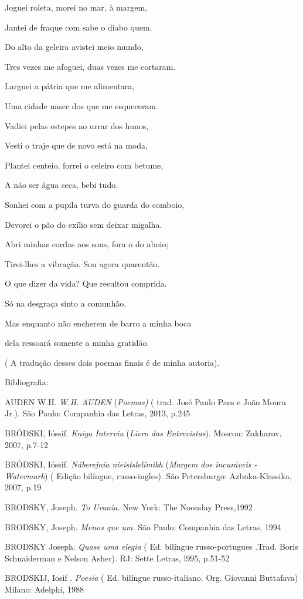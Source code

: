 Joguei roleta, morei no mar, à margem,

Jantei de fraque com sabe o diabo quem.

Do alto da geleira avistei meio mundo,

Tres vezes me afoguei, duas vezes me cortaram.

Larguei a pátria que me alimentara,

Uma cidade nasce dos que me esqueceram.

Vadiei pelas estepes ao urrar dos hunos,

Vesti o traje que de novo está na moda,

Plantei centeio, forrei o celeiro com betume,

A não ser água seca, bebi tudo.

Sonhei com a pupila turva do guarda do comboio,

Devorei o pão do exílio sem deixar migalha.

Abri minhas cordas aos sons, fora o do aboio;

Tirei-lhes a vibração. Sou agora quarentão.

O que dizer da vida? Que resultou comprida.

Só na desgraça sinto a comunhão.

Mas enquanto não encherem de barro a minha boca

dela ressoará somente a minha gratidão.

( A tradução desses dois poemas finais é de minha autoria).

Bibliografia:

AUDEN W.H. \emph{W.H. AUDEN} (\emph{Poemas)} ( trad. José Paulo Paes e
João Moura Jr.). São Paulo: Companhia das Letras, 2013, p.245

BRÓDSKI, Ióssif. \emph{Kniga Interviu} (\emph{Livro das Entrevistas}).
Moscou: Zakharov, 2007, p.7-12

BRÓDSKI, Ióssif. \emph{Náberejnia nieistslelímikh} (\emph{Margem dos
incuráveis - Watermark}) ( Edição bilíngue, russo-ingles). São
Petersburgo: Azbuka-Klassika, 2007, p.19

BRODSKY, Joseph. \emph{To Urania.} New York: The Noonday Press,1992

BRODSKY, Joseph. \emph{Menos que um.} São Paulo: Companhia das Letras,
1994

BRODSKY Joseph. \emph{Quase uma elegia} ( Ed. bilíngue russo-portugues
.Trad. Boris Schnaiderman e Nelson Asher). RJ: Sette Letras, l995,
p.51-52

BRODSKIJ, Iosif . \emph{Poesia} ( Ed. bilíngue russo-italiano. Org.
Giovanni Buttafava) Milano: Adelphi, 1988

